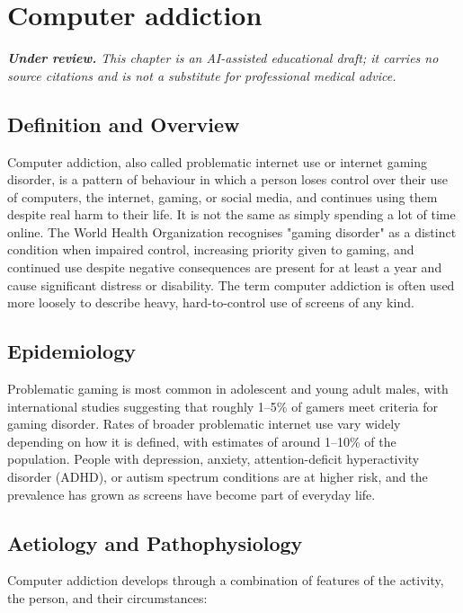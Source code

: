 \chapter{Computer addiction}

\medskip
\noindent\textit{\textbf{Under review.} This chapter is an AI-assisted educational draft; it carries no source citations and is not a substitute for professional medical advice.}

\section*{Definition and Overview}
Computer addiction, also called problematic internet use or internet gaming disorder, is a pattern of behaviour in which a person loses control over their use of computers, the internet, gaming, or social media, and continues using them despite real harm to their life. It is not the same as simply spending a lot of time online. The World Health Organization recognises "gaming disorder" as a distinct condition when impaired control, increasing priority given to gaming, and continued use despite negative consequences are present for at least a year and cause significant distress or disability. The term computer addiction is often used more loosely to describe heavy, hard-to-control use of screens of any kind.

\section*{Epidemiology}
Problematic gaming is most common in adolescent and young adult males, with international studies suggesting that roughly 1--5\% of gamers meet criteria for gaming disorder. Rates of broader problematic internet use vary widely depending on how it is defined, with estimates of around 1--10\% of the population. People with depression, anxiety, attention-deficit hyperactivity disorder (ADHD), or autism spectrum conditions are at higher risk, and the prevalence has grown as screens have become part of everyday life.

\section*{Aetiology and Pathophysiology}
Computer addiction develops through a combination of features of the activity, the person, and their circumstances:

